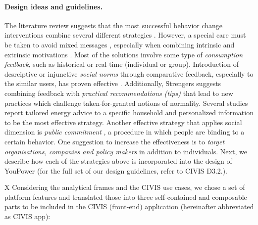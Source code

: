 \paragraph{Design ideas and guidelines.} The literature review suggests that the most successful behavior change interventions combine several different strategies \cite{gardner1996environmental,ockwell2009reorienting}. However, a special care must be taken to avoid mixed messages \cite{knowles2014patterns}, especially when combining intrinsic and extrinsic motivations \cite{delmas2013information}.
Most of the solutions involve some type of \textit{consumption feedback}, such as historical or real-time (individual or group). Introduction of desrciptive or injunctive \textit{social norms} through comparative feedback, especially to the similar users, has proven effective \cite{allcott2011social,cialdini2001harnessing,petkov2011motivating}. Additionally, Strengers \cite{strengers2011designing} suggests combining feedback with \textit{practical recommendations (tips)} that lead to new practices which challenge taken-for-granted notions of normality. Several studies \cite{abrahamse2005review,delmas2013information} report tailored energy advice to a specific household and personalized information to be the most effective strategy. Another effective strategy that applies social dimension is \textit{public commitment} \cite{abrahamse2005review}, a procedure in which people are binding to a certain behavior. One suggestion to increase the effectiveness is to \textit{target organisations, companies and policy makers} \cite{hasselqvist2015supporting,brynjarsdottir2012sustainably} in addition to individuals.
Next, we describe how each of the strategies above is incorporated into the design of YouPower (for the full set of our design guidelines, refer to CIVIS D3.2.).


X Considering the analytical frames and the CIVIS use cases, we chose a set of platform features and translated those into three self-contained and composable parts to be included in the CIVIS (front-end) application (hereinafter abbreviated as CIVIS app): 


